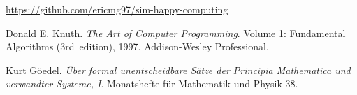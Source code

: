 \documentclass[a4paper,10pt,twocolumn]{article}
\begin{document}
\href{https://github.com/ericmg97/sim-happy-computing}{https://github.com/ericmg97/sim-happy-computing}
\begin{thebibliography}{99}
	 Donald E. Knuth. \emph{The Art of Computer Programming}.
		Volume 1: Fundamental Algorithms (3rd~edition), 1997.
		Addison-Wesley Professional.

	 Kurt Göedel. \emph{Über formal unentscheidbare Sätze der
		Principia Mathematica und verwandter Systeme, I}.
		Monatshefte für Mathematik und Physik 38.

\end{thebibliography}


\label{end}
\end{document}
